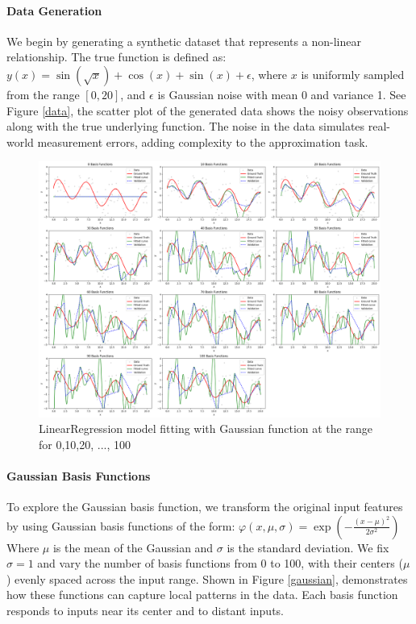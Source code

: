 \documentclass{article}
\begin{document}
\paragraph{Data Generation}
We begin by generating a synthetic dataset that represents a non-linear relationship. The true function is defined as: $y(x) = \sin(\sqrt{x}) + \cos(x) + \sin(x) + \epsilon$, where $x$ is uniformly sampled from the range $[0, 20]$, and $\epsilon$ is Gaussian noise with mean 0 and variance 1. See Figure \ref{data}, the scatter plot of the generated data shows the noisy observations along with the true underlying function. The noise in the data simulates real-world measurement errors, adding complexity to the approximation task.
\begin{figure}[H]
    \centering
    \includegraphics[width=1\linewidth,height=0.26\textheight]{figures/gaussian_data.png} 
    \caption{LinearRegression model fitting with Gaussian function at the range for 0,10,20, ..., 100}
    \label{gaussian data}
\end{figure}

\paragraph{Gaussian Basis Functions}
To explore the Gaussian basis function, we transform the original input features by using Gaussian basis functions of the form:
$\varphi(x, \mu, \sigma) = \exp\left(-\frac{(x - \mu)^2}{2\sigma^2}\right)$
Where $\mu$ is the mean of the Gaussian and $\sigma$ is the standard deviation. We fix $\sigma = 1$ and vary the number of basis functions from 0 to 100, with their centers ($\mu$) evenly spaced across the input range. Shown in Figure \ref{gaussian}, demonstrates how these functions can capture local patterns in the data. Each basis function responds to inputs near its center and to distant inputs.
\end{document}
